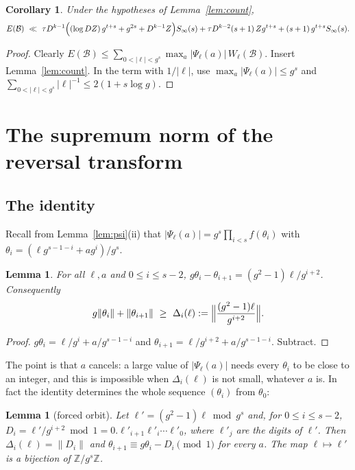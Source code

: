 \documentclass[11pt]{amsart}
\newtheorem{lemma}[theorem]{Lemma}
\newtheorem{corollary}[theorem]{Corollary}
\theoremstyle{definition}
\numberwithin{equation}{section}
\newcommand{\cB}{\mathcal{B}}
\newcommand{\Z}{\mathbb{Z}}
\newcommand{\Sinf}{S_\infty}
\begin{document}
\begin{corollary}\label{cor:E}
Under the hypotheses of Lemma~\ref{lem:count},
\[
E(\cB)\ \ll\ \tau D^{k-1}\Bigl((\log DZ)\,g^{t+s}+g^{2s}+D^{k-1}Z\Bigr)\Sinf(s)
+\tau D^{k-2}(s+1)\,Zg^{t+s}+(s+1)\,g^{t+s}\Sinf(s).
\]
\end{corollary}

\begin{proof}
Clearly $E(\cB)\le\sum_{0<|\ell|<g^s}\max_a|\Psi_\ell(a)|\,W_\ell(\cB)$.
Insert Lemma~\ref{lem:count}. In the term with $1/|\ell|$, use
$\max_a|\Psi_\ell(a)|\le g^s$ and
$\sum_{0<|\ell|<g^s}|\ell|^{-1}\le2(1+s\log g)$.
\end{proof}

\section{The supremum norm of the reversal transform}\label{sec:sup}

\subsection{The identity}
Recall from Lemma~\ref{lem:psi}(ii) that $|\Psi_\ell(a)|=g^s\prod_{i<s}f(\theta_i)$
with $\theta_i=(\ell g^{s-1-i}+ag^i)/g^s$.

\begin{lemma}\label{lem:diff}
For all $\ell,a$ and $0\le i\le s-2$,
$g\theta_i-\theta_{i+1}=(g^2-1)\ell/g^{i+2}$. Consequently
\[
g\|\theta_i\|+\|\theta_{i+1}\|\ \ge\ \Delta_i(\ell):=\Bigl\|\frac{(g^2-1)\ell}{g^{i+2}}\Bigr\|.
\]
\end{lemma}

\begin{proof}
$g\theta_i=\ell/g^i+a/g^{s-1-i}$ and $\theta_{i+1}=\ell/g^{i+2}+a/g^{s-1-i}$.
Subtract.
\end{proof}

The point is that $a$ cancels: a large value of $|\Psi_\ell(a)|$ needs every
$\theta_i$ to be close to an integer, and this is impossible when
$\Delta_i(\ell)$ is not small, whatever $a$ is. In fact the identity
determines the whole sequence $(\theta_i)$ from $\theta_0$:

\begin{lemma}[forced orbit]\label{lem:orbit}
Let $\ell'=(g^2-1)\ell\bmod g^s$ and, for $0\le i\le s-2$,
$D_i=\ell'/g^{i+2}\bmod1=0.\ell'_{i+1}\ell'_i\cdots\ell'_0$, where
$\ell'_j$ are the digits of $\ell'$. Then
$\Delta_i(\ell)=\|D_i\|$ and $\theta_{i+1}\equiv g\theta_i-D_i\pmod1$ for every
$a$. The map $\ell\mapsto\ell'$ is a bijection of $\Z/g^s\Z$.
\end{lemma}
\end{document}
